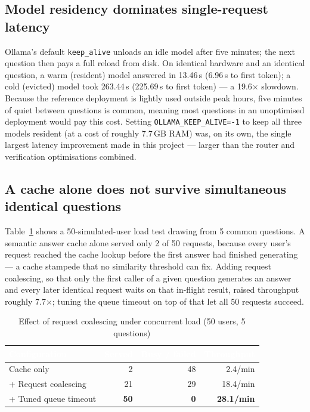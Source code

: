 \documentclass[11pt,a4paper,oneside]{report}
\begin{document}
\subsection{Model residency dominates single-request latency}
Ollama's default \texttt{keep\_alive} unloads an idle model after five
minutes; the next question then pays a full reload from disk. On identical
hardware and an identical question, a warm (resident) model answered in
13.46\,s (6.96\,s to first token); a cold (evicted) model took 263.44\,s
(225.69\,s to first token) --- a 19.6$\times$ slowdown. Because the reference
deployment is lightly used outside peak hours, five minutes of quiet between
questions is common, meaning most questions in an unoptimised deployment
would pay this cost. Setting \texttt{OLLAMA\_KEEP\_ALIVE=-1} to keep all
three models resident (at a cost of roughly 7.7\,GB RAM) was, on its own, the
single largest latency improvement made in this project --- larger than the
router and verification optimisations combined.

\subsection{A cache alone does not survive simultaneous identical questions}
Table~\ref{tab:coalescing} shows a 50-simulated-user load test drawing from 5
common questions. A semantic answer cache alone served only 2 of 50 requests,
because every user's request reached the cache lookup before the first
answer had finished generating --- a cache stampede that no similarity
threshold can fix. Adding request coalescing, so that only the first caller
of a given question generates an answer and every later identical request
waits on that in-flight result, raised throughput roughly 7.7$\times$; tuning
the queue timeout on top of that let all 50 requests succeed.

\begin{table}[h]
\centering
\caption{Effect of request coalescing under concurrent load (50 users, 5 questions)}
\label{tab:coalescing}
\renewcommand{\arraystretch}{1.3}
\begin{tabular}{|l|r|r|r|}
\hline
\rowcolor{hdrnavy}
\textcolor{white}{Configuration} & \textcolor{white}{Served} &
\textcolor{white}{Busy / failed} & \textcolor{white}{Throughput} \\
\hline
Cache only & 2 & 48 & 2.4/min \\
\hline
+ Request coalescing & 21 & 29 & 18.4/min \\
\hline
\rowcolor{hdrblue}
+ Tuned queue timeout & \textbf{50} & \textbf{0} & \textbf{28.1/min} \\
\hline
\end{tabular}
\end{table}
\end{document}
